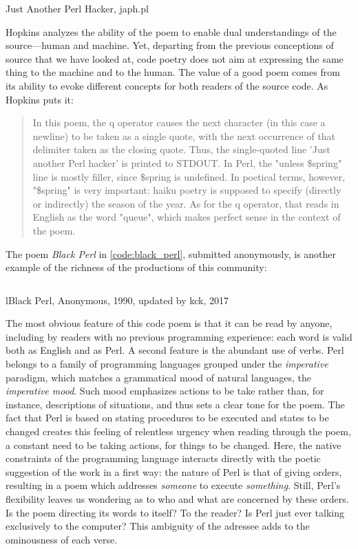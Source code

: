\begin{listing}
  \inputminted{perl}{./corpus/japh.pl}
  \caption{Just Another Perl Hacker, japh.pl}
  \label{code:japh_perl}
\end{listing}

Hopkins analyzes the ability of the poem to enable dual understandings of the source—human and machine. Yet, departing from the previous conceptions of source that we have looked at, code poetry does not aim at expressing the same thing to the machine and to the human. The value of a good poem comes from its ability to evoke different concepts for both readers of the source code. As Hopkins puts it:

\begin{quote}
  In this poem, the q operator causes the next character (in this case a newline) to be taken as a single quote, with the next occurrence of that delimiter taken as the closing quote. Thus, the single-quoted line 'Just another Perl hacker' is printed to STDOUT. In Perl, the "unless \$spring" line is mostly filler, since \$spring is undefined. In poetical terms, however, "\$spring" is very important: haiku poetry is supposed to specify (directly or indirectly) the season of the year. As for the q operator, that reads in English as the word "queue", which makes perfect sense in the context of the poem. \citep{hopkins_camels_1992}
\end{quote}

The poem \emph{Black Perl} in \ref{code:black_perl}, submitted anonymously, is another example of the richness of the productions of this community:


\begin{listing}
  \inputminted{perl}{./corpus/black_perl.pl}
  \caption{lBlack Perl, Anonymous, 1990, updated by kck, 2017}
  \label{code:black_perl}
\end{listing}

The most obvious feature of this code poem is that it can be read by anyone, including by readers with no previous programming experience: each word is valid both as English and as Perl. A second feature is the abundant use of verbs. Perl belongs to a family of programming languages grouped under the \emph{imperative} paradigm, which matches a grammatical mood of natural languages, the \emph{imperative mood}. Such mood emphasizes actions to be take rather than, for instance, descriptions of situations, and thus sets a clear tone for the poem. The fact that Perl is based on stating procedures to be executed and states to be changed creates this feeling of relentless urgency when reading through the poem, a constant need to be taking actions, for things to be changed. Here, the native constraints of the programming language interacts directly with the poetic suggestion of the work in a first way: the nature of Perl is that of giving orders, resulting in a poem which addresses \emph{someone} to execute \emph{something}. Still, Perl's flexibility leaves us wondering as to who and what are concerned by these orders. Is the poem directing its words to itself? To the reader? Is Perl just ever talking exclusively to the computer? This ambiguity of the adressee adds to the ominousness of each verse.


